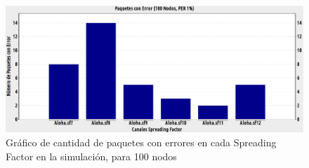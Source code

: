 \begin{figure}[!ht]
\centering
\includegraphics[angle=270, scale=0.4]{images/errores100nodos.eps}
\caption{Gráfico de cantidad de paquetes con errores en cada Spreading Factor en la simulación, para 100 nodos}
\label{anexb:4}
\end{figure}

